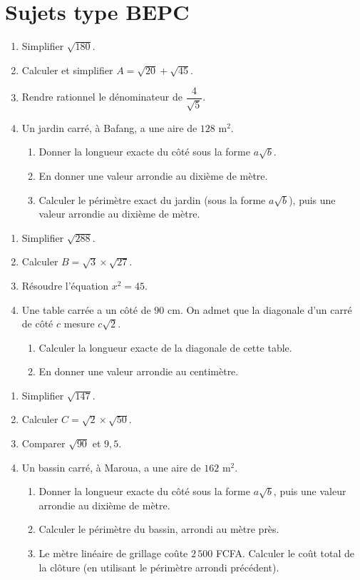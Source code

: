 \section{Sujets type BEPC}

\begin{enumerate}[label=\arabic*)]
\item Simplifier $\sqrt{180}$.
\item Calculer et simplifier $A=\sqrt{20}+\sqrt{45}$.
\item Rendre rationnel le dénominateur de $\dfrac4{\sqrt5}$.
\item Un jardin carré, à Bafang, a une aire de $128\text{ m}^2$.
\begin{enumerate}[label=\alph*)]
\item Donner la longueur exacte du côté sous la forme $a\sqrt b$.
\item En donner une valeur arrondie au dixième de mètre.
\item Calculer le périmètre exact du jardin (sous la forme $a\sqrt b$), puis une valeur
arrondie au dixième de mètre.
\end{enumerate}
\end{enumerate}

\begin{enumerate}[label=\arabic*)]
\item Simplifier $\sqrt{288}$.
\item Calculer $B=\sqrt3\times\sqrt{27}$.
\item Résoudre l'équation $x^{2}=45$.
\item Une table carrée a un côté de $90$ cm. On admet que la diagonale d'un carré de côté
$c$ mesure $c\sqrt2$.
\begin{enumerate}[label=\alph*)]
\item Calculer la longueur exacte de la diagonale de cette table.
\item En donner une valeur arrondie au centimètre.
\end{enumerate}
\end{enumerate}

\begin{enumerate}[label=\arabic*)]
\item Simplifier $\sqrt{147}$.
\item Calculer $C=\sqrt2\times\sqrt{50}$.
\item Comparer $\sqrt{90}$ et $9{,}5$.
\item Un bassin carré, à Maroua, a une aire de $162\text{ m}^2$.
\begin{enumerate}[label=\alph*)]
\item Donner la longueur exacte du côté sous la forme $a\sqrt b$, puis une valeur arrondie
au dixième de mètre.
\item Calculer le périmètre du bassin, arrondi au mètre près.
\item Le mètre linéaire de grillage coûte $2\,500$ FCFA. Calculer le coût total de la
clôture (en utilisant le périmètre arrondi précédent).
\end{enumerate}
\end{enumerate}

